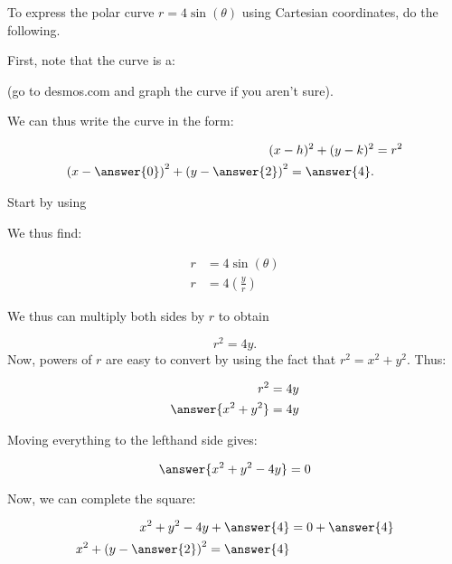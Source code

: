 \documentclass{ximera}
\author{Jim Talamo }
\begin{document}
\begin{exercise}

To express the polar curve $r= 4\sin(\theta)$ using Cartesian coordinates, do the following.

First, note that the curve is a:

\begin{multipleChoice}
\end{multipleChoice}

(go to desmos.com and graph the curve if you aren't sure).

We can thus write the curve in the form:

\begin{align*}
(x-h)^2+(y-k)^2&=r^2\\
\left(x- \answer{0}\right)^2+\left(y-\answer{2 }\right)^2 = \answer{4 }.
\end{align*}

\begin{hint}
Start by using

\begin{multipleChoice}
\end{multipleChoice}

We thus find:

\begin{align*}
r &= 4\sin(\theta) \\
r & = 4 \left(\frac{y}{r} \right)
\end{align*}

\begin{question}
We thus can multiply both sides by $r$ to obtain

\[
r^2 =4y.
\]
Now, powers of $r$ are easy to convert by using the fact that $r^2 = x^2+y^2$.  Thus:

\begin{align*}
r^2 &=4y\\
\answer{x^2+y^2} &= 4y
\end{align*}

Moving everything to the lefthand side gives:

\[
\answer{x^2+y^2-4y} = 0
\]

\begin{question}
Now, we can complete the square:

\begin{align*}
x^2+y^2-4y +\answer{4} &= 0 + \answer{4} \\
x^2 + \left(y- \answer{2}\right)^2 = \answer{4}
\end{align*}
\end{question}
\end{question}

\end{hint}

\end{exercise}
\end{document}

